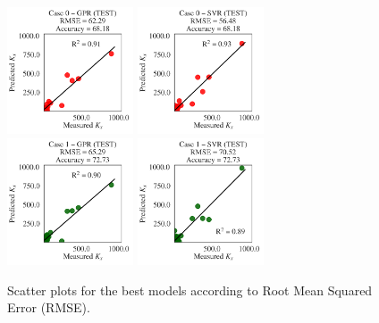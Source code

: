 \documentclass[a4paper,12pt, english]{article}
\begin{document}
\begin{figure}[!htb] \centering 
 \includegraphics[width=0.33245\textwidth]{./scatter/eml____300dpi_scatter_best_model___gpr__case_0__test}
 \includegraphics[width=0.33245\textwidth]{./scatter/eml____300dpi_scatter_best_model___svr__case_0__test}
 \includegraphics[width=0.33245\textwidth]{./scatter/eml____300dpi_scatter_best_model___gpr__case_1__test}
 \includegraphics[width=0.33245\textwidth]{./scatter/eml____300dpi_scatter_best_model___svr__case_1__test}
 \caption{\label{fig:eml____300dpi_scatter_best_model___ldc}
 Scatter plots for the best models according to Root Mean Squared Error (RMSE).}
\end{figure}
 
\end{document}
